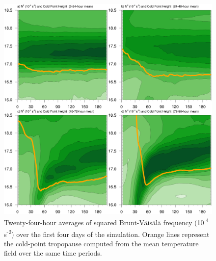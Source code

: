 \documentclass{ametsoc}
\begin{document}
\begin{figure}[ht]
\centerline{\includegraphics[width=39pc]{figures/fig02_n2-24hr-avgs.png}}
\caption{Twenty-four-hour averages of squared Brunt-V{\"a}is{\"a}l{\"a} frequency (10\textsuperscript{-4} s\textsuperscript{-2}) over the first four days of the simulation. Orange lines represent the cold-point tropopause computed from the mean temperature field over the same time periods.}
\label{fig:n2-24hr-avgs}
\end{figure}
\end{document}
